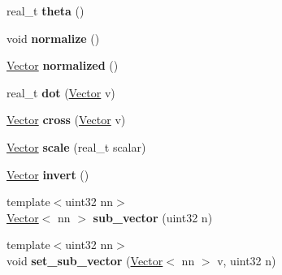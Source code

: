 \begin{DoxyCompactItemize}
\item 
\hypertarget{classetk_1_1_vector_ad341fc0a23b2c8cb734beed314f9f17a}{real\-\_\-t {\bfseries theta} ()}\label{classetk_1_1_vector_ad341fc0a23b2c8cb734beed314f9f17a}

\item 
\hypertarget{classetk_1_1_vector_ae7f3db6458bd9a6e03dd8b24f2770dc5}{void {\bfseries normalize} ()}\label{classetk_1_1_vector_ae7f3db6458bd9a6e03dd8b24f2770dc5}

\item 
\hypertarget{classetk_1_1_vector_aea85c6a2ccfa94d6591d226deefdf515}{\hyperlink{classetk_1_1_vector}{Vector} {\bfseries normalized} ()}\label{classetk_1_1_vector_aea85c6a2ccfa94d6591d226deefdf515}

\item 
\hypertarget{classetk_1_1_vector_a836a830d76aa7fff1f902e99814502bd}{real\-\_\-t {\bfseries dot} (\hyperlink{classetk_1_1_vector}{Vector} v)}\label{classetk_1_1_vector_a836a830d76aa7fff1f902e99814502bd}

\item 
\hypertarget{classetk_1_1_vector_aa9ab624901a330e48c44e5e16d5c5b4a}{\hyperlink{classetk_1_1_vector}{Vector} {\bfseries cross} (\hyperlink{classetk_1_1_vector}{Vector} v)}\label{classetk_1_1_vector_aa9ab624901a330e48c44e5e16d5c5b4a}

\item 
\hypertarget{classetk_1_1_vector_afd94e371cb2080dfc5c713885f3eed9c}{\hyperlink{classetk_1_1_vector}{Vector} {\bfseries scale} (real\-\_\-t scalar)}\label{classetk_1_1_vector_afd94e371cb2080dfc5c713885f3eed9c}

\item 
\hypertarget{classetk_1_1_vector_aaf944f75926a97454beffc04250f3a7e}{\hyperlink{classetk_1_1_vector}{Vector} {\bfseries invert} ()}\label{classetk_1_1_vector_aaf944f75926a97454beffc04250f3a7e}

\item 
\hypertarget{classetk_1_1_vector_ad7f7d3a14f074933d09ad3abc07f9019}{{\footnotesize template$<$uint32 nn$>$ }\\\hyperlink{classetk_1_1_vector}{Vector}$<$ nn $>$ {\bfseries sub\-\_\-vector} (uint32 n)}\label{classetk_1_1_vector_ad7f7d3a14f074933d09ad3abc07f9019}

\item 
\hypertarget{classetk_1_1_vector_a94a274e82d99f4e94d0628804f2cdf1d}{{\footnotesize template$<$uint32 nn$>$ }\\void {\bfseries set\-\_\-sub\-\_\-vector} (\hyperlink{classetk_1_1_vector}{Vector}$<$ nn $>$ v, uint32 n)}\label{classetk_1_1_vector_a94a274e82d99f4e94d0628804f2cdf1d}


\end{DoxyCompactItemize}
